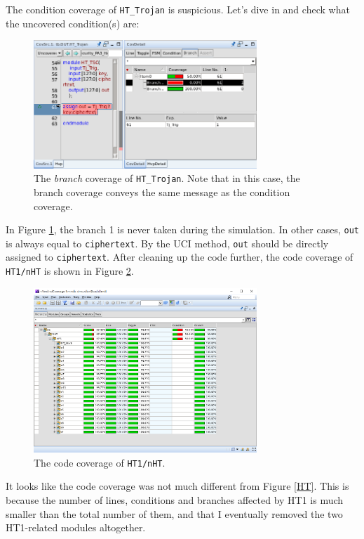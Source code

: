 \documentclass{article}
\begin{document}
The condition coverage of \verb|HT_Trojan| is suspicious. Let's dive in and check what the uncovered condition(s) are:

\begin{figure}[h] \centering
\includegraphics[width=0.75\textwidth]{HT1-1}
\caption{The \textit{branch} coverage of \texttt{HT\_Trojan}. Note that in this case, the branch coverage conveys the same message as the condition coverage.}
\label{HT1-1}
\end{figure}

In Figure \ref{HT1-1}, the branch 1 is never taken during the simulation. In other cases, \verb|out| is always equal to \verb|ciphertext|. By the UCI \cite{5504712} method, \verb|out| should be directly assigned to \verb|ciphertext|. After cleaning up the code further, the code coverage of \verb|HT1/nHT| is shown in Figure \ref{nHT1}.

\begin{figure}[h] \centering
\includegraphics[width=0.75\textwidth]{nHT1}
\caption{The code coverage of \texttt{HT1/nHT}.}
\label{nHT1}
\end{figure}

It looks like the code coverage was not much different from Figure \ref{HT}. This is because the number of lines, conditions and branches affected by HT1 is much smaller than the total number of them, and that I eventually removed the two HT1-related modules altogether.
\end{document}
